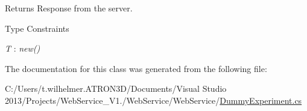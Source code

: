 \begin{DoxyReturn}{Returns}
Response from the server. 
\end{DoxyReturn}
\begin{Desc}
\item[Type Constraints]\begin{description}
\item[{\em T} : {\em new()}]\end{description}
\end{Desc}


The documentation for this class was generated from the following file\+:\begin{DoxyCompactItemize}
\item 
C\+:/\+Users/t.\+wilhelmer.\+A\+T\+R\+O\+N3\+D/\+Documents/\+Visual Studio 2013/\+Projects/\+Web\+Service\+\_\+\+V1./\+Web\+Service/\+Web\+Service/\hyperlink{_dummy_experiment_8cs}{Dummy\+Experiment.\+cs}\end{DoxyCompactItemize}
